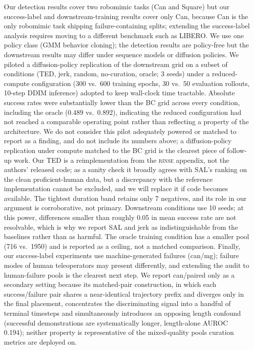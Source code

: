 \documentclass{article}
\newcommand{\rinse}{\textsc{rinse}}
\begin{document}
Our detection results cover two robomimic tasks (Can and Square) but our
success-label and downstream-training results cover only Can, because Can is
the only robomimic task shipping failure-containing splits; extending the
success-label analysis requires moving to a different benchmark such as
LIBERO. We use one policy class (GMM behavior cloning); the detection
results are policy-free but the downstream results may differ under sequence
models or diffusion policies. We piloted a diffusion-policy replication of
the downstream grid on a subset of conditions (TED, jerk, random,
no-curation, oracle; 3 seeds) under a reduced-compute configuration (300
vs.\ 600 training epochs, 30 vs.\ 50 evaluation rollouts, 10-step DDIM
inference) adopted to keep wall-clock time tractable. Absolute success
rates were substantially lower than the BC grid across every condition,
including the oracle (0.489 vs.\ 0.892), indicating the reduced
configuration had not reached a comparable operating point rather than
reflecting a property of the architecture. We do not consider this pilot
adequately powered or matched to report as a finding, and do not include
its numbers above; a diffusion-policy replication under compute matched to
the BC grid is the clearest piece of follow-up work.
Our TED is a reimplementation from the \rinse{} appendix, not the authors'
released code; as a sanity check it broadly agrees with SAL's ranking on the
clean proficient-human data, but a discrepancy with the reference
implementation cannot be excluded, and we will replace it if code becomes
available. The tightest duration band retains only 7 negatives, and its
role in our argument is corroborative, not primary. Downstream conditions
use 10 seeds; at this power, differences smaller than roughly 0.05 in mean
success rate are not resolvable, which is why we report SAL and jerk as
indistinguishable from the baselines rather than as harmful. The oracle training
condition has a smaller pool (716 vs.\ 1950) and is reported as a ceiling,
not a matched comparison. Finally, our success-label experiments use
machine-generated failures (can/mg); failure modes of human teleoperators
may present differently, and extending the audit to human-failure pools is
the clearest next step. We report can/paired only as a secondary setting
because its matched-pair construction, in which each success/failure pair
shares a near-identical trajectory prefix and diverges only in the final
placement, concentrates the discriminating signal into a handful of
terminal timesteps and simultaneously introduces an opposing length
confound (successful demonstrations are systematically longer, length-alone
AUROC 0.194); neither property is representative of the mixed-quality pools
curation metrics are deployed on.
\end{document}
